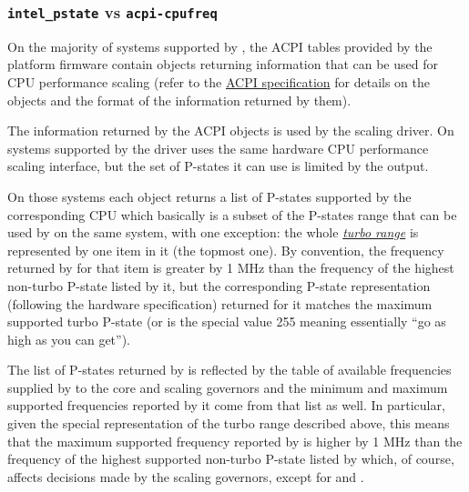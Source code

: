 \documentclass[a4paper,8pt,english]{sphinxmanual}
\begin{document}
\subsubsection{\texttt{intel\_pstate} vs \texttt{acpi-cpufreq}}
\label{admin-guide/pm/intel_pstate:intel-pstate-vs-acpi-cpufreq}\label{admin-guide/pm/intel_pstate:acpi-cpufreq}
On the majority of systems supported by , the ACPI tables
provided by the platform firmware contain  objects returning information
that can be used for CPU performance scaling (refer to the \href{http://www.uefi.org/sites/default/files/resources/ACPI\_6\_1.pdf}{ACPI specification}
for details on the  objects and the format of the information returned
by them).

The information returned by the ACPI  objects is used by the
 scaling driver.  On systems supported by 
the  driver uses the same hardware CPU performance scaling
interface, but the set of P-states it can use is limited by the 
output.

On those systems each  object returns a list of P-states supported by
the corresponding CPU which basically is a subset of the P-states range that can
be used by  on the same system, with one exception: the whole
{\hyperref[admin\string-guide/pm/intel_pstate:turbo]{\emph{turbo range}}}\label{admin-guide/pm/intel_pstate:turbo} is represented by one item in it (the topmost one).  By
convention, the frequency returned by  for that item is greater by 1 MHz
than the frequency of the highest non-turbo P-state listed by it, but the
corresponding P-state representation (following the hardware specification)
returned for it matches the maximum supported turbo P-state (or is the
special value 255 meaning essentially ``go as high as you can get'').

The list of P-states returned by  is reflected by the table of
available frequencies supplied by  to the  core and
scaling governors and the minimum and maximum supported frequencies reported by
it come from that list as well.  In particular, given the special representation
of the turbo range described above, this means that the maximum supported
frequency reported by  is higher by 1 MHz than the frequency
of the highest supported non-turbo P-state listed by  which, of course,
affects decisions made by the scaling governors, except for  and
.
\end{document}
